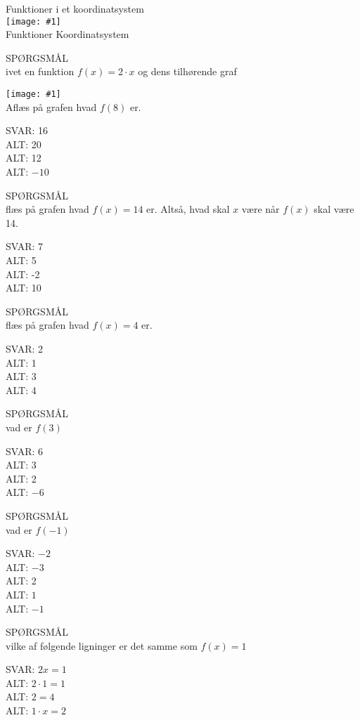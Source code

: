 \documentclass[]{article}
\newcounter{spgcounter}
\newenvironment{question}[2]{\addtocounter{spgcounter}{1} SPØRGSMÅL \thespgcounter\\}{\hspace{50px}}
\newcommand{\name}[1]{{\huge #1}\\}
\newcommand{\tag}[1]{#1}
\newcommand{\cover}[1]{\texttt{[image: \#1]}\\}
\newcommand{\image}[1]{\texttt{[image: \#1]}\\}
\newcommand{\answer}[1]{{\color{green} SVAR: #1}\\}
\newcommand{\alt}[1]{{\color{red} ALT: #1}\\}
\begin{document}
\name{Funktioner i et koordinatsystem}
\cover{funktionergrafkoordinat.png}
\tag{Funktioner}
\tag{Koordinatsystem}

\begin{question}{multi}
    
Givet en funktion $f(x)=2 \cdot x$ og dens tilhørende graf

\image{linearfunktion.png}

Aflæs på grafen hvad $f(8)$ er.

\answer{16}
\alt{20}
\alt{12}
\alt{$-10$}

\end{question}

\begin{question}{multi}
    
    Aflæs på grafen hvad $f(x)=14$ er. Altså, hvad skal $x$ være når $f(x)$ skal være 14.
    
    \answer{7}
    \alt{5}
    \alt{-2}
    \alt{10}
    
\end{question}

\begin{question}{multi}
    
    Aflæs på grafen hvad $f(x)=4$ er.
    
    \answer{2}
    \alt{1}
    \alt{3}
    \alt{4}

\end{question}


\begin{question}{multi}

Hvad er $f(3)$

\answer{6}
\alt{3}
\alt{2}
\alt{$-6$}

\end{question}

\begin{question}{multi}
    
Hvad er $f(-1)$

\answer{$-2$}
\alt{$-3$}
\alt{2}
\alt{$1$}
\alt{$-1$}

\end{question}

\begin{question}{multi}
    
Hvilke af følgende ligninger er det samme som $f(x)=1$
    
\answer{$2x=1$}
\alt{$2\cdot 1 = 1$}
\alt{$2=4$}
\alt{$1 \cdot x=2$}
    
\end{question}
\end{document}
